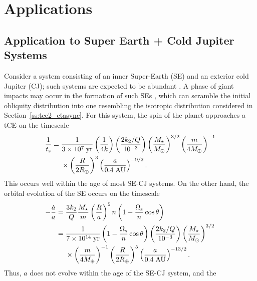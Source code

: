 \documentclass[
        fleqn,
        usenatbib,
    ]{mnras}
\newcommand*{\p}[1]{\left(#1\right)}
\begin{document}
\section{Applications}\label{s:applications}

\subsection{Application to Super Earth + Cold Jupiter Systems
}\label{ss:disc_sehj}

Consider a system consisting of an inner Super-Earth (SE) and an exterior cold
Jupiter (CJ); such systems are expected to be abundant \citep{zhu2018super}. A
phase of giant impacts may occur in the formation of such SEs
\citep{inamdar2015formation, izidoro2017breaking}, which can scramble the
initial obliquity distribution into one resembling the isotropic distribution
considered in Section~\ref{ss:tce2_etasync}. For this system, the spin of the
planet approaches a tCE on the timescale
\begin{align}
    \frac{1}{t_{\rm s}} ={}& \frac{1}{3 \times 10^7\;\mathrm{yr}}
            \p{\frac{1}{4k}}
            \p{\frac{2k_2/Q}{10^{-3}}}
            \p{\frac{M_\star}{M_{\odot}}}^{3/2}
            \p{\frac{m}{4M_{\oplus}}}^{-1}\nonumber\\
        &\times \p{\frac{R}{2R_{\oplus}}}^3
            \p{\frac{a}{0.4\;\mathrm{AU}}}^{-9/2}.
\end{align}
This occurs well within the age of most SE-CJ systems. On the other hand,
the orbital evolution of the SE occurs on the timescale \citep{lai2012}
\begin{align}
    -\frac{\dot{a}}{a} ={}& \frac{3k_2}{Q}\frac{M_\star}{m}
            \p{\frac{R}{a}}^5n \p{1 - \frac{\Omega_{\rm s}}{n}\cos \theta}\nonumber\\
        ={}& \frac{1}{7 \times 10^{14}\;\mathrm{yr}}
            \p{1 - \frac{\Omega_{\rm s}}{n}\cos \theta}
            \p{\frac{2k_2/Q}{10^{-3}}}
            \p{\frac{M_\star}{M_{\odot}}}^{3/2}\nonumber\\
        &\times \p{\frac{m}{4M_{\oplus}}}^{-1}
            \p{\frac{R}{2R_{\oplus}}}^5
            \p{\frac{a}{0.4\;\mathrm{AU}}}^{-13/2}.
\end{align}
Thus, $a$ does not evolve within the age of the SE-CJ system, and the
\end{document}
